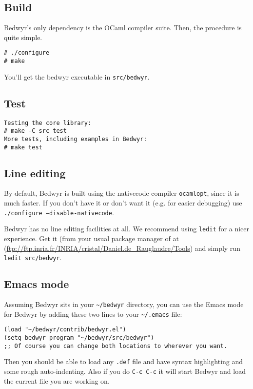 \documentclass{article}
\begin{document}
\subsection{Build}

Bedwyr's only dependency is the OCaml compiler suite.
Then, the procedure is quite simple.

\begin{verbatim}
# ./configure
# make
\end{verbatim}

You'll get the bedwyr executable in \texttt{src/bedwyr}.

\subsection{Test}

\begin{verbatim}
Testing the core library:
# make -C src test
More tests, including examples in Bedwyr:
# make test
\end{verbatim}

\subsection{Line editing}

By default, Bedwyr is built using the nativecode compiler \texttt{ocamlopt},
since it is much faster. If you don't have it or don't want it (e.g.
for easier debugging) use \texttt{./configure --disable-nativecode}.

Bedwyr has no line editing facilities at all. We recommend using \texttt{ledit}
for a nicer experience. Get it (from your usual package manager of at
(\url{ftp://ftp.inria.fr/INRIA/cristal/Daniel.de_Rauglaudre/Tools})
and simply run \texttt{ledit src/bedwyr}.

\subsection{Emacs mode}

Assuming Bedwyr sits in your \verb.~/bedwyr. directory,
you can use the Emacs mode for Bedwyr by adding these two lines to your
\verb,~/.emacs, file:
\begin{verbatim}
(load "~/bedwyr/contrib/bedwyr.el")
(setq bedwyr-program "~/bedwyr/src/bedwyr")
;; Of course you can change both locations to wherever you want.
\end{verbatim}

Then you should be able to load any \verb:.def: file
and have syntax highlighting and some rough auto-indenting.
Also if you do \verb.C-c C-c. it will start Bedwyr
and load the current file you are working on.
\end{document}
